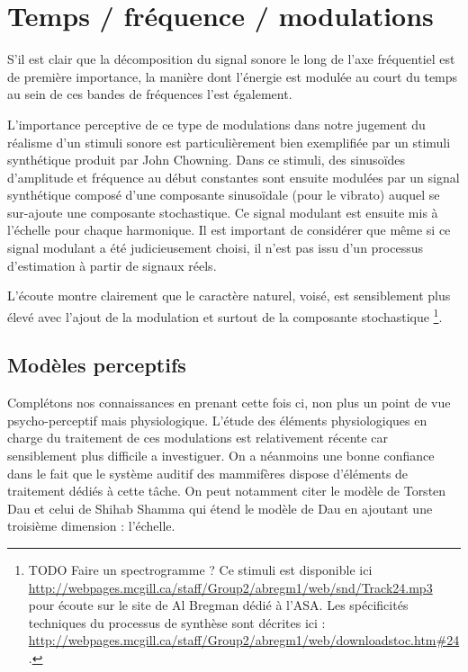 \section{ \nmu Temps / fréquence / modulations}  \label{sec:tfm}

S'il est clair que la décomposition du signal sonore le long de l'axe fréquentiel est de première importance, la manière dont l'énergie est modulée au court du temps au sein de ces bandes de fréquences l'est également.

L'importance perceptive de ce type de modulations dans notre jugement du réalisme d'un stimuli sonore est particulièrement bien exemplifiée par un stimuli synthétique produit par John Chowning. Dans ce stimuli, des sinusoïdes d'amplitude et fréquence au début constantes sont ensuite modulées par un signal synthétique composé d'une composante sinusoïdale (pour le vibrato) auquel se sur-ajoute une composante stochastique. Ce signal modulant est ensuite mis à l'échelle pour chaque harmonique. Il est important de considérer que même si ce signal modulant a été judicieusement choisi, il n'est pas issu d'un processus d'estimation à partir de signaux réels.

L'écoute montre clairement que le caractère naturel, voisé, est sensiblement plus élevé avec l'ajout de la modulation et surtout de la composante stochastique \footnote{TODO Faire un spectrogramme ? Ce stimuli est disponible ici \url{http://webpages.mcgill.ca/staff/Group2/abregm1/web/snd/Track24.mp3} pour écoute sur le site de Al Bregman dédié à l'ASA. Les spécificités techniques du processus de synthèse sont décrites ici : \url{http://webpages.mcgill.ca/staff/Group2/abregm1/web/downloadstoc.htm\#24}.}.

\subsection{Modèles perceptifs}

Complétons nos connaissances en prenant cette fois ci, non plus un point de vue psycho-perceptif mais physiologique. L'étude des éléments physiologiques en charge du traitement de ces modulations est relativement récente car sensiblement plus difficile a investiguer. On a néanmoins une bonne confiance dans le fait que le système auditif des mammifères dispose d'éléments de traitement dédiés à cette tâche. On peut notamment citer le modèle de Torsten Dau\cite{dau1997modeling} et celui de Shihab Shamma\cite{fritz2003rapid} qui étend le modèle de Dau en ajoutant une troisième dimension : l'échelle.

